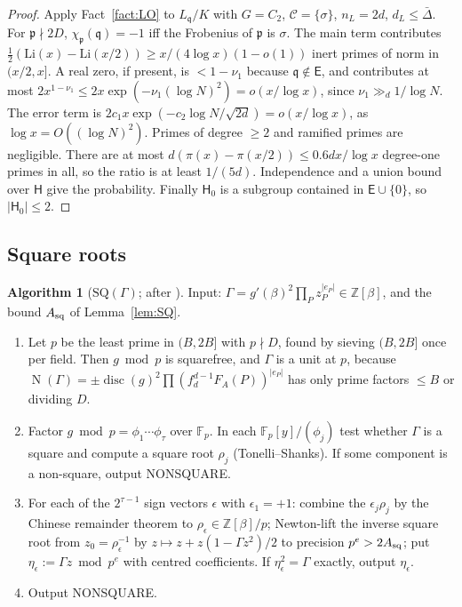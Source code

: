 \documentclass[11pt]{amsart}
\theoremstyle{definition}
\newtheorem{algorithm}[theorem]{Algorithm}
\newcommand{\Z}{\mathbb{Z}}
\newcommand{\F}{\mathbb{F}}
\newcommand{\sH}{\mathsf{H}}
\newcommand{\fq}{\mathfrak{q}}
\newcommand{\fp}{\mathfrak{p}}
\newcommand{\disc}{\operatorname{disc}}
\newcommand{\Norm}{\operatorname{N}}
\begin{document}
\begin{proof}
Apply Fact~\ref{fact:LO} to $L_\fq/K$ with $G=C_2$, $\mathcal C=\{\sigma\}$, $n_L=2d$, $d_L\le\bar\Delta$. For $\fp\nmid2D$, $\chi_\fp(\fq)=-1$ iff the Frobenius
of $\fp$ is $\sigma$. The main term contributes $\frac12(\mathrm{Li}(x)-\mathrm{Li}(x/2))\ge x/(4\log x)(1-o(1))$ inert primes of norm in $(x/2,x]$. A real zero,
if present, is $<1-\nu_1$ because $\fq\notin\mathsf E$, and contributes at most $2x^{1-\nu_1}\le2x\exp(-\nu_1(\log N)^2)=o(x/\log x)$, since $\nu_1\gg_d1/\log N$.
The error term is $2c_1x\exp(-c_2\log N/\sqrt{2d})=o(x/\log x)$, as $\log x=O((\log N)^2)$. Primes of degree $\ge2$ and ramified primes are
negligible. There are at most $d(\pi(x)-\pi(x/2))\le0.6dx/\log x$ degree-one primes in all, so the ratio is at least $1/(5d)$. Independence and a
union bound over $\sH$ give the probability. Finally $\sH_0$ is a subgroup contained in $\mathsf E\cup\{0\}$, so $|\sH_0|\le2$.
\end{proof}

\subsection{Square roots}

\begin{algorithm}[$\mathrm{SQ}(\Gamma)$; after {\cite[\S9]{blp1993}}]\label{alg:SQ}
Input: $\Gamma=g'(\beta)^2\prod_Pz_P^{|e_P|}\in\Z[\beta]$, and the bound $A_{\rm sq}$ of Lemma~\ref{lem:SQ}.
\begin{enumerate}[label=\arabic*.]
\item Let $p$ be the least prime in $(B,2B]$ with $p\nmid D$, found by sieving $(B,2B]$ once per field. Then $g\bmod p$ is squarefree, and
  $\Gamma$ is a unit at $p$, because $\Norm(\Gamma)=\pm\disc(g)^2\prod(f_d^{d-1}F_A(P))^{|e_P|}$ has only prime factors $\le B$ or dividing $D$.
\item Factor $g\bmod p=\phi_1\cdots\phi_\tau$ over $\F_p$. In each $\F_p[y]/(\phi_j)$ test whether $\Gamma$ is a square and compute a
  square root $\rho_j$ (Tonelli--Shanks). If some component is a non-square, output NONSQUARE.
\item For each of the $2^{\tau-1}$ sign vectors $\epsilon$ with $\epsilon_1=+1$: combine the $\epsilon_j\rho_j$ by the Chinese remainder theorem to
  $\rho_\epsilon\in\Z[\beta]/p$; Newton-lift the inverse square root from $z_0=\rho_\epsilon^{-1}$ by $z\mapsto z+z(1-\Gamma z^2)/2$ to precision
  $p^e>2A_{\rm sq}$; put $\eta_\epsilon:=\Gamma z\bmod p^e$ with centred coefficients. If $\eta_\epsilon^2=\Gamma$ exactly, output $\eta_\epsilon$.
\item Output NONSQUARE.
\end{enumerate}
\end{algorithm}
\end{document}
